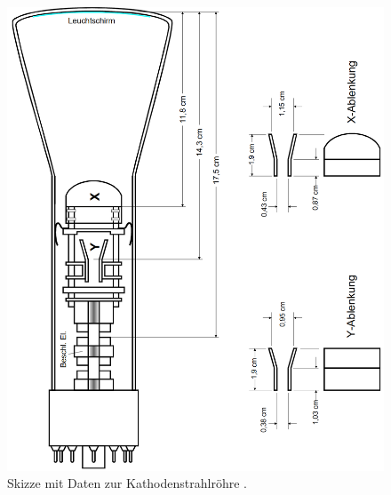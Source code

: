 \newpage
{}
\label{sec:Anhang}

\begin{figure}[h!]
  \centering
  \includegraphics[width=\textwidth]{data/roehre.png}
  \caption{Skizze mit Daten zur Kathodenstrahlröhre \cite{Versuchsanleitung501}.}
  \label{fig:roehre}
\end{figure}
